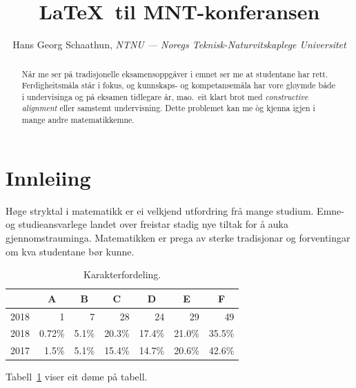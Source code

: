 \documentclass[nynorsk]{mnt}
\title{\LaTeX\ til MNT-konferansen}
\author{Hans Georg Schaathun,
\emph{NTNU --- Noregs Teknisk-Naturvitskaplege Universitet}}
\begin{document}
\maketitle

\begin{abstract}
   Når me ser på tradisjonelle eksamensoppgåver i emnet ser me at 
   studentane har rett. Ferdigheitsmåla står i fokus, og kunnskaps-
   og kompetansemåla har vore gløymde både i undervisinga og på
   eksamen tidlegare år, mao.\ eit klart brot med 
   \emph{constructive alignment} \citep{biggs11a} 
   eller samstemt undervisning.
   Dette problemet kan me òg kjenna igjen i mange andre matematikkemne.
\end{abstract}

\section{Innleiing}

Høge stryktal i matematikk er ei velkjend utfordring frå mange studium.
Emne- og studieansvarlege landet over freistar 
stadig nye tiltak for å auka gjennomstrauminga.
Matematikken er prega av sterke tradisjonar og forventingar om kva
studentane bør kunne.

\begin{table}
\centering
  \caption{Karakterfordeling.}
  \begin{tabular}{l|r|r|r|r|r|r|}
     & \multicolumn{1}{c|}{A}
     & \multicolumn{1}{c|}{B}
     & \multicolumn{1}{c|}{C}
     & \multicolumn{1}{c|}{D}
     & \multicolumn{1}{c|}{E}
     & \multicolumn{1}{c|}{F} \\
  \hline
  2018 & 1 & 7 & 28 & 24 & 29 & 49 \\
  \hline
  2018 &
  \num{0.72}\% &
  \num{5.1}\% &
  \num{20.3}\% &
  \num{17.4}\% &
  \num{21.0}\% &
  \num{35.5}\%  \\
  \hline
  2017 &
  \num{1.5}\% &
  \num{5.1}\% &
  \num{15.4}\% &
  \num{14.7}\% &
  \num{20.6}\% &
  \num{42.6}\% \\
  \hline
  \end{tabular}
  \label{tab:grade}
\end{table}


Tabell~\ref{tab:grade} viser eit døme på tabell.
\end{document}
